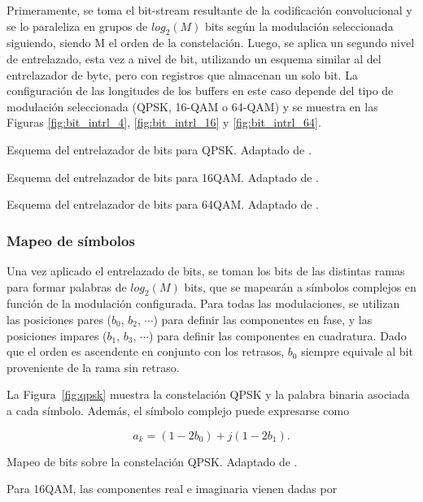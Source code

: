 Primeramente, se toma el bit-stream resultante de la codificación convolucional y se lo paraleliza en grupos de $log_2(M)$ bits según la modulación seleccionada siguiendo, siendo M el orden de la constelación. Luego, se aplica un segundo nivel de entrelazado, esta vez a nivel de bit, utilizando un esquema similar al del entrelazador de byte, pero con registros que almacenan un solo bit. La configuración de las longitudes de los buffers en este caso depende del tipo de modulación seleccionada (QPSK, 16-QAM o 64-QAM) y se muestra en las Figuras \ref{fig:bit_intrl_4}, \ref{fig:bit_intrl_16} y \ref{fig:bit_intrl_64}.

{Esquema del entrelazador de bits para QPSK.}
{Adaptado de \cite{isdbt}.}
{\label{fig:bit_intrl_4}}

{Esquema del entrelazador de bits para 16QAM.}
{Adaptado de \cite{isdbt}.}
{\label{fig:bit_intrl_16}}

{Esquema del entrelazador de bits para 64QAM.}
{Adaptado de \cite{isdbt}.}
{\label{fig:bit_intrl_64}}

\subsubsection{Mapeo de símbolos}

Una vez aplicado el entrelazado de bits, se toman los bits de las distintas ramas para formar palabras de \(log_2(M)\) bits, que se mapearán a símbolos complejos en función de la modulación configurada. Para todas las modulaciones, se utilizan las posiciones pares (\(b_0\), \(b_2\), \(\cdots\)) para definir las componentes en fase, y las posiciones impares (\(b_1\), \(b_3\), \(\cdots\)) para definir las componentes en cuadratura. Dado que el orden es ascendente en conjunto con los retrasos, \(b_0\) siempre equivale al bit proveniente de la rama sin retraso.

La Figura~\ref{fig:qpsk} muestra la constelación QPSK y la palabra binaria asociada a cada símbolo. Además, el símbolo complejo puede expresarse como

\begin{equation}
a_k = (1 - 2b_0) + j(1 - 2b_1).
\end{equation}

{Mapeo de bits sobre la constelación QPSK.}
{Adaptado de \cite{isdbt}.}
{\label{fig:qpsk}}

Para 16QAM, las componentes real e imaginaria vienen dadas por

